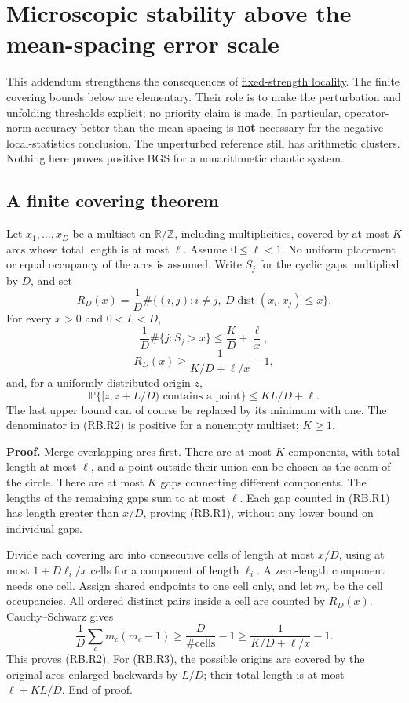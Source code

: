 \section{Microscopic stability above the mean-spacing error scale}\label{sec:robustness}
This addendum strengthens the consequences of \hyperref[sec:locality]{fixed-strength locality}. The finite covering bounds below are elementary. Their role is to make the perturbation and unfolding thresholds explicit; no priority claim is made. In particular, operator-norm accuracy better than the mean spacing is \textbf{not} necessary for the negative local-statistics conclusion. The unperturbed reference still has arithmetic clusters. Nothing here proves positive BGS for a nonarithmetic chaotic system.

\subsection{A finite covering theorem}\label{robustness:a-finite-covering-theorem}

Let \(x_1,\ldots,x_D\) be a multiset on \(\mathbb R/\mathbb Z\), including multiplicities, covered by at most \(K\) arcs whose total length is at most \(\ell\). Assume \(0\leq\ell<1\). No uniform placement or equal occupancy of the arcs is assumed. Write \(S_j\) for the cyclic gaps multiplied by \(D\), and set \[
 R_D(x)=\frac1D\#\{(i,j):i\ne j,\ D\operatorname{dist}(x_i,x_j)\leq x\}.
\] For every \(x>0\) and \(0<L<D\), \[
 \frac1D\#\{j:S_j>x\}\leq\frac KD+\frac{\ell}{x},          \tag{RB.R1}
\] \[
 R_D(x)\geq\frac1{K/D+\ell/x}-1,                           \tag{RB.R2}
\] and, for a uniformly distributed origin \(z\), \[
 \mathbb P\{[z,z+L/D)\text{ contains a point}\}
                   \leq KL/D+\ell.                        \tag{RB.R3}
\] The last upper bound can of course be replaced by its minimum with one. The denominator in (RB.R2) is positive for a nonempty multiset; \(K\geq1\).

\textbf{Proof.} Merge overlapping arcs first. There are at most \(K\) components, with total length at most \(\ell\), and a point outside their union can be chosen as the seam of the circle. There are at most \(K\) gaps connecting different components. The lengths of the remaining gaps sum to at most \(\ell\). Each gap counted in (RB.R1) has length greater than \(x/D\), proving (RB.R1), without any lower bound on individual gaps.

Divide each covering arc into consecutive cells of length at most \(x/D\), using at most \(1+D\ell_i/x\) cells for a component of length \(\ell_i\). A zero-length component needs one cell. Assign shared endpoints to one cell only, and let \(m_c\) be the cell occupancies. All ordered distinct pairs inside a cell are counted by \(R_D(x)\). Cauchy--Schwarz gives \[
 \frac1D\sum_c m_c(m_c-1)
 \geq \frac D{\#\text{cells}}-1
 \geq\frac1{K/D+\ell/x}-1.
\] This proves (RB.R2). For (RB.R3), the possible origins are covered by the original arcs enlarged backwards by \(L/D\); their total length is at most \(\ell+KL/D\). End of proof.

